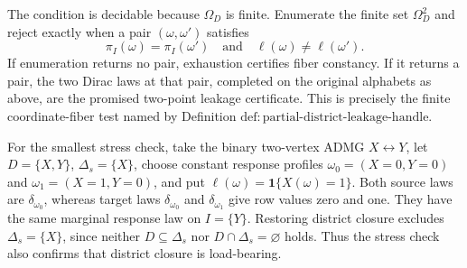 The condition is decidable because \(\Omega_D\) is finite.  Enumerate the finite set \(\Omega_D^2\) and reject exactly when a pair \((\omega,\omega')\) satisfies
\[
\pi_I(\omega)=\pi_I(\omega')
\quad\text{and}\quad
\ell(\omega)\ne\ell(\omega').
\tag{12}
\]
If enumeration returns no pair, exhaustion certifies fiber constancy.  If it returns a pair, the two Dirac laws at that pair, completed on the original alphabets as above, are the promised two-point leakage certificate.  This is precisely the finite coordinate-fiber test named by Definition \(\mathrm{def:partial\text{-}district\text{-}leakage\text{-}handle}\).

For the smallest stress check, take the binary two-vertex ADMG \(X\leftrightarrow Y\), let \(D=\{X,Y\}\), \(\Delta_s=\{X\}\), choose constant response profiles \(\omega_0=(X=0,Y=0)\) and \(\omega_1=(X=1,Y=0)\), and put \(\ell(\omega)=\mathbf 1\{X(\omega)=1\}\).  Both source laws are \(\delta_{\omega_0}\), whereas target laws \(\delta_{\omega_0}\) and \(\delta_{\omega_1}\) give row values zero and one.  They have the same marginal response law on \(I=\{Y\}\).  Restoring district closure excludes \(\Delta_s=\{X\}\), since neither \(D\subseteq\Delta_s\) nor \(D\cap\Delta_s=\varnothing\) holds.  Thus the stress check also confirms that district closure is load-bearing.
